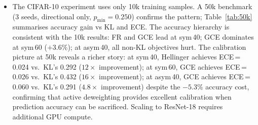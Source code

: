 \documentclass[11pt]{article}
\begin{document}
\begin{itemize}
  \item The CIFAR-10 experiment uses only 10k training samples.
    A 50k benchmark (3 seeds, directional only, $p_{\min}=0.250$) confirms the pattern;
    Table~\ref{tab:50k} summarises accuracy gain vs KL and ECE.
    The accuracy hierarchy is consistent with the 10k results: FR and GCE lead at sym\,40;
    GCE dominates at sym\,60 ($+3.6\%$); at asym\,40, all non-KL objectives hurt.
    The calibration picture at 50k reveals a richer story:
    at sym\,40, Hellinger achieves ECE\,=\,0.024 vs.\ KL's 0.292 ($12\times$ improvement);
    at sym\,60, GCE achieves ECE\,=\,0.026 vs.\ KL's 0.432 ($16\times$ improvement);
    at asym\,40, GCE achieves ECE\,=\,0.060 vs.\ KL's 0.291 ($4.8\times$ improvement)
    despite the $-5.3\%$ accuracy cost, confirming that active deweighting provides
    excellent calibration when prediction accuracy can be sacrificed.
    Scaling to ResNet-18 requires additional GPU compute.


\end{itemize}
\end{document}
